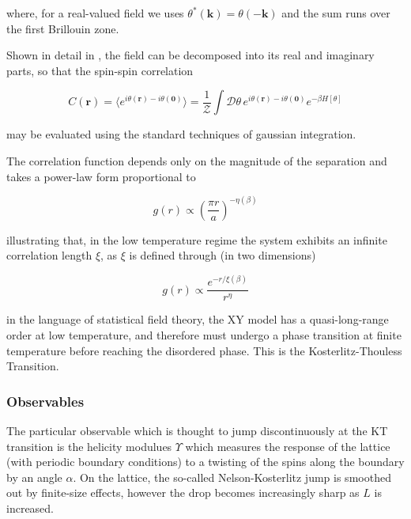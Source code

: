 \documentclass[12pt]{article}
\begin{document}
where, for a real-valued field we uses $\theta^*(\mathbf{k})=\theta(-\mathbf{k})$ and the sum runs over the first Brillouin zone.

Shown in detail in \cite{drouintouchette2022kosterlitzthoulessphasetransitionintroduction}, the field can be decomposed into its real and imaginary parts, so that the
spin-spin correlation

\begin{equation*}
	C(\mathbf{r}) = \langle e^{i\theta(\mathbf{r}) - i\theta(\mathbf{0})} \rangle = \frac{1}{\mathcal{Z}} \int \mathcal{D}\theta \, e^{i\theta(\mathbf{r}) - i\theta(\mathbf{0})} e^{-\beta H[\theta]}
\end{equation*}

may be evaluated using the standard techniques of gaussian integration.

The correlation function depends only on the magnitude of the separation and takes a power-law form proportional to

\begin{equation*}
	g(r) \propto \left(\frac{\pi r}{a}\right)^{-\eta(\beta)}
\end{equation*}

illustrating that, in the low temperature regime the system exhibits an infinite correlation length $\xi$, as $\xi$ is defined through (in two dimensions)

\begin{equation*}
	g(r) \propto \frac{e^{-r/\xi(\beta)}}{r^{\eta}}
\end{equation*}

in the language of statistical field theory, the XY model has a quasi-long-range order at low temperature, and therefore must undergo a phase transition
at finite temperature before reaching the disordered phase. This is the Kosterlitz-Thouless Transition. 

\subsubsection{Observables}

The particular observable which is thought to jump discontinuously at the KT transition is the helicity modulues $\Upsilon$ which measures the 
response of the lattice (with periodic boundary conditions) to a twisting of the spins along the boundary by an angle $\alpha$. On the lattice, the so-called
Nelson-Kosterlitz jump is smoothed out by finite-size effects, however the drop becomes increasingly sharp as $L$ is increased.
\end{document}
